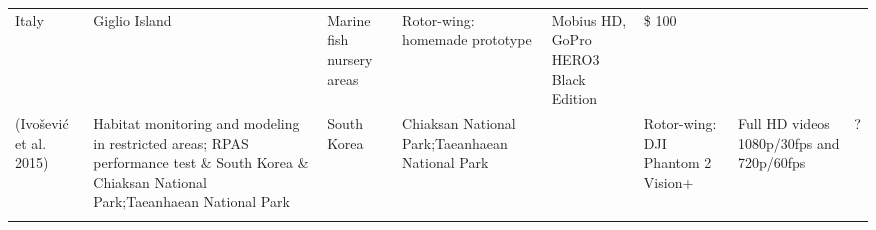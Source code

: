 \documentclass[]{interact}
\theoremstyle{plain}%
\theoremstyle{definition}
\theoremstyle{remark}
\begin{document}
\begin{longtable}[]{@{}llllllll@{}}
\begin{minipage}[t]{0.03\columnwidth}
Italy\strut
\end{minipage} & \begin{minipage}[t]{0.14\columnwidth}\raggedright\strut
Giglio Island\strut
\end{minipage} & \begin{minipage}[t]{0.10\columnwidth}\raggedright\strut
Marine fish nursery areas\strut
\end{minipage} & \begin{minipage}[t]{0.09\columnwidth}\raggedright\strut
Rotor-wing: homemade prototype\strut
\end{minipage} & \begin{minipage}[t]{0.11\columnwidth}\raggedright\strut
Mobius HD, GoPro HERO3 Black Edition\strut
\end{minipage} & \begin{minipage}[t]{0.01\columnwidth}\raggedright\strut
\$ 100\strut
\end{minipage}\tabularnewline
\begin{minipage}[t]{0.11\columnwidth}\raggedright\strut
(Ivošević et al. 2015)\strut
\end{minipage} & \begin{minipage}[t]{0.18\columnwidth}\raggedright\strut
Habitat monitoring and modeling in restricted areas; RPAS performance
test \& South Korea \& Chiaksan National Park;Taeanhaean National
Park\strut
\end{minipage} & \begin{minipage}[t]{0.03\columnwidth}\raggedright\strut
South Korea\strut
\end{minipage} & \begin{minipage}[t]{0.14\columnwidth}\raggedright\strut
Chiaksan National Park;Taeanhaean National Park\strut
\end{minipage} & \begin{minipage}[t]{0.10\columnwidth}\raggedright\strut
\strut
\end{minipage} & \begin{minipage}[t]{0.09\columnwidth}\raggedright\strut
Rotor-wing: DJI Phantom 2 Vision+\strut
\end{minipage} & \begin{minipage}[t]{0.11\columnwidth}\raggedright\strut
Full HD videos 1080p/30fps and 720p/60fps\strut
\end{minipage} & \begin{minipage}[t]{0.01\columnwidth}\raggedright\strut
?\strut
\end{minipage}\tabularnewline
\begin{minipage}[t]{0.11\columnwidth}\raggedright\strut

\end{minipage}
\end{longtable}
\end{document}
